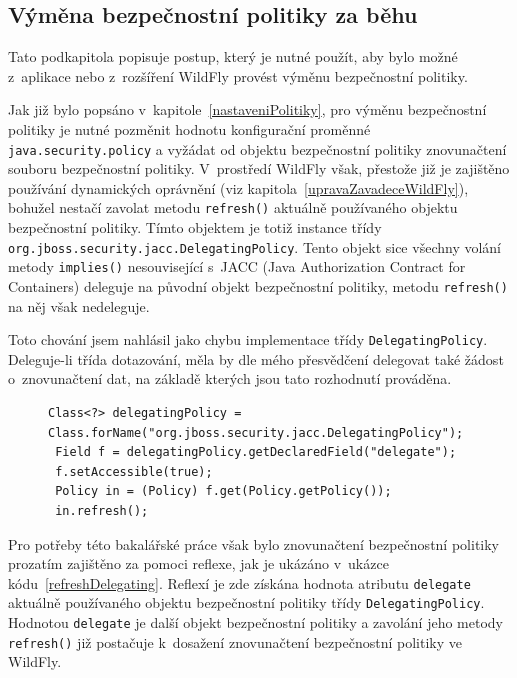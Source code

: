 \subsection{Výměna bezpečnostní politiky za běhu} \label{zmenaZaBehu}

Tato podkapitola popisuje postup, který je nutné použít, aby bylo možné z~aplikace nebo z~rozšíření WildFly provést výměnu bezpečnostní politiky.

Jak již bylo popsáno v~kapitole~\ref{nastaveniPolitiky}, pro výměnu bezpečnostní politiky je nutné pozměnit hodnotu konfigurační proměnné
{\tt java.security.policy} a vyžádat od objektu bezpečnostní politiky znovunačtení souboru bezpečnostní politiky.
V~prostředí WildFly však, přestože již je zajištěno používání dynamických oprávnění (viz kapitola~\ref{upravaZavadeceWildFly}), bohužel nestačí zavolat metodu {\tt refresh()} aktuálně používaného objektu bezpečnostní politiky. Tímto objektem je totiž instance třídy {\tt org.jboss.security.jacc.DelegatingPolicy}. Tento objekt sice všechny volání metody {\tt implies()} nesouvisející s~JACC (Java Authorization Contract for Containers) deleguje na původní objekt bezpečnostní politiky, metodu {\tt refresh()} na něj však nedeleguje.

Toto chování jsem nahlásil jako chybu implementace třídy {\tt DelegatingPolicy}. Deleguje-li třída dotazování, měla by dle mého přesvědčení delegovat také žádost o~znovunačtení dat, na základě kterých jsou tato rozhodnutí prováděna.~\cite{issueDelegating}

\begin{figure}[b!]
\begin{lstlisting}[caption=Znovunačtení bezpečnostní politiky při nastavené {\tt DelegatingPolicy}, label=refreshDelegating]
 Class<?> delegatingPolicy = Class.forName("org.jboss.security.jacc.DelegatingPolicy");
 Field f = delegatingPolicy.getDeclaredField("delegate");
 f.setAccessible(true);
 Policy in = (Policy) f.get(Policy.getPolicy());
 in.refresh();
\end{lstlisting}
\end{figure}

Pro potřeby této bakalářské práce však bylo znovunačtení bezpečnostní politiky prozatím zajištěno za pomoci reflexe, jak je ukázáno v~ukázce kódu~\ref{refreshDelegating}.
Reflexí je zde získána hodnota atributu {\tt delegate} aktuálně používaného objektu bezpečnostní politiky třídy {\tt DelegatingPolicy}.
Hodnotou {\tt delegate} je další objekt bezpečnostní politiky a zavolání jeho metody {\tt refresh()} již postačuje k~dosažení znovunačtení bezpečnostní politiky ve WildFly.

